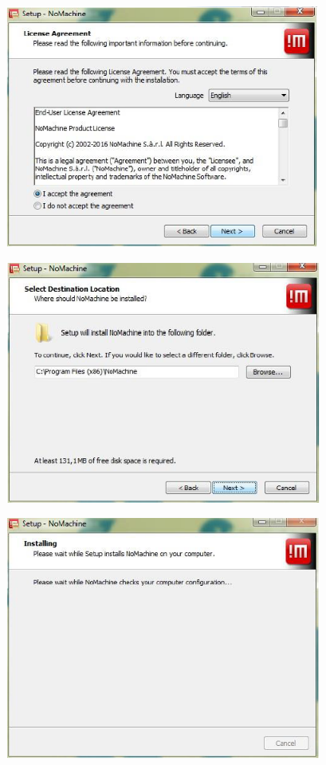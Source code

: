 \documentclass[
  11pt,
  a4paper,
]{article}
\begin{document}
\includegraphics[width=4.06374in,height=3.14961in]{./media/image21.png}

\includegraphics[width=4.09365in,height=3.14961in]{./media/image22.png}

\includegraphics[width=4.09365in,height=3.14961in]{./media/image23.png}
\end{document}
